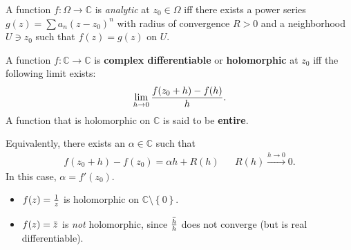 \begin{definition}[Analytic]

A function \(f:\Omega \to {\mathbb{C}}\) is \emph{analytic} at
\(z_0\in \Omega\) iff there exists a power series
\(g(z) = \sum a_n (z-z_0)^n\) with radius of convergence \(R>0\) and a
neighborhood \(U\ni z_0\) such that \(f(z) = g(z)\) on \(U\).

\end{definition}

\begin{definition}

A function \(f: {\mathbb{C}}\to {\mathbb{C}}\) is \textbf{complex
differentiable} or \textbf{holomorphic} at \(z_0\) iff the following
limit exists:
\begin{align*}
\lim_{h\to 0} { f(z_0 + h) - f(h) \over h  } 
.\end{align*}
A function that is holomorphic on \({\mathbb{C}}\) is said to be
\textbf{entire}.

Equivalently, there exists an \(\alpha\in {\mathbb{C}}\) such that
\begin{align*}
f(z_0+h) - f(z_0) = \alpha h + R(h) && R(h) \overset{h\to 0}\longrightarrow 0 
.\end{align*}
In this case, \(\alpha = f'(z_0)\).

\end{definition}

\begin{example}

\envlist

\begin{itemize}
\tightlist
\item
  \(f(z) = {1\over z}\) is holomorphic on
  \({\mathbb{C}}\setminus\left\{{0}\right\}\).
\item
  \(f(z) = \mkern 1.5mu\overline{\mkern-1.5muz\mkern-1.5mu}\mkern 1.5mu\)
  is \emph{not} holomorphic, since
  \(\mkern 1.5mu\overline{\mkern-1.5muh\mkern-1.5mu}\mkern 1.5mu \over h\)
  does not converge (but is real differentiable).
\end{itemize}

\end{example}

